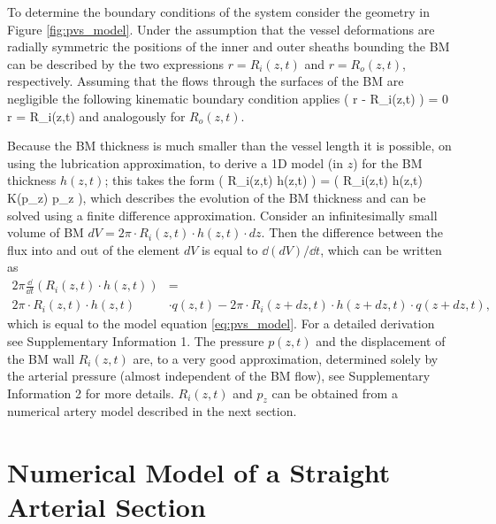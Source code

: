 \documentclass[a4paper,titlepage]{scrartcl}
\begin{document}
To determine the boundary conditions of the system consider the geometry in Figure \ref{fig:pvs_model}. Under the assumption that the vessel deformations are radially symmetric the positions of the inner and outer sheaths bounding the BM can be described by the two expressions $r = R_i(z,t)$ and $r = R_o(z,t)$, respectively. Assuming that the flows through the surfaces of the BM are negligible the following kinematic boundary condition applies
\beq \label{eq:kinematic}  
 \left( r - R_i(z,t) \right) = 0 \quad {} r = R_i(z,t)
\eeq
and analogously for $R_o(z,t)$.

Because the BM thickness is much smaller than the vessel length it is possible, on using the lubrication approximation, to derive a 1D model (in $z$) for the BM thickness $h(z,t)$; this takes the form
\beq
{} \left( R_i(z,t) \cdot h(z,t) \right) =  \left( R_i(z,t) \cdot h(z,t) \cdot K(p_{z}) \cdot p_{z} \right),\label{eq:pvs_model}
\eeq
which describes the evolution of the BM thickness and can be solved using a finite difference approximation. Consider an infinitesimally small volume of BM $dV = 2\pi \cdot R_i(z,t) \cdot h(z,t) \cdot dz$. Then the difference between the flux into and out of the element $dV$ is equal to $\dd (dV)/ \dd t$, which can be written as
\begin{align}
2\pi \frac{\dd}{\dd t} \left( R_i(z,t) \cdot h(z,t) \right) &= \nonumber \\ 
2\pi \cdot R_i(z,t) \cdot h(z,t) & \cdot q(z,t) - 2\pi \cdot R_i(z + dz,t) \cdot h(z + dz,t) \cdot q(z + dz,t),
\end{align}
which is equal to the model equation \eqref{eq:pvs_model}. For a detailed derivation see Supplementary Information 1. The pressure $p(z,t)$ and the displacement of the BM wall $R_i(z,t)$ are, to a very good approximation, determined solely by the arterial pressure (\ie almost independent of the BM flow), see Supplementary Information 2 for more details. $R_i(z,t)$ and $p_z$ can be obtained from a numerical artery model described in the next section.


\section{Numerical Model of a Straight Arterial Section}
\end{document}
